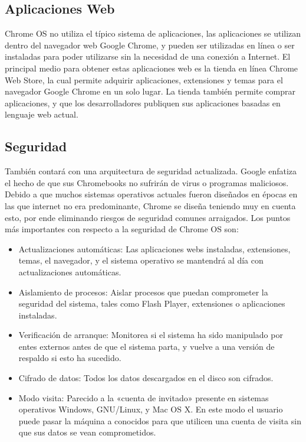\documentclass[paper=a4, fontsize=12pt]{article} 		%
\numberwithin{equation}{section}						%
\numberwithin{table}{section} 							%
\begin{document}
\subsection{Aplicaciones Web }
Chrome OS no utiliza el típico sistema de aplicaciones, las aplicaciones se utilizan dentro del navegador web Google Chrome, y pueden ser utilizadas en línea o ser instaladas para poder utilizarse sin la necesidad de una conexión a Internet. El principal medio para obtener estas aplicaciones web es la tienda en línea Chrome Web Store, la cual permite adquirir aplicaciones, extensiones y temas para el navegador Google Chrome en un solo lugar. La tienda también permite comprar aplicaciones, y que los desarrolladores publiquen sus aplicaciones basadas en lenguaje web actual.
\subsection{Seguridad }
También contará con una arquitectura de seguridad actualizada. Google enfatiza el hecho de que sus Chromebooks no sufrirán de virus o programas maliciosos. Debido a que muchos sistemas operativos actuales fueron diseñados en épocas en las que internet no era predominante, Chrome se diseña teniendo muy en cuenta esto, por ende eliminando riesgos de seguridad comunes arraigados.
Los puntos más importantes con respecto a la seguridad de Chrome OS son:
\begin{itemize}
\item Actualizaciones automáticas: Las aplicaciones webs instaladas, extensiones, temas, el navegador, y el sistema operativo se mantendrá al día con actualizaciones automáticas.
\item     Aislamiento de procesos: Aislar procesos que puedan comprometer la seguridad del sistema, tales como Flash Player, extensiones o aplicaciones instaladas.
\item     Verificación de arranque: Monitorea si el sistema ha sido manipulado por entes externos antes de que el sistema parta, y vuelve a una versión de respaldo si esto ha sucedido.
\item     Cifrado de datos: Todos los datos descargados en el disco son cifrados.
\item     Modo visita: Parecido a la «cuenta de invitado» presente en sistemas operativos Windows, GNU/Linux, y Mac OS X. En este modo el usuario puede pasar la máquina a conocidos para que utilicen una cuenta de visita sin que sus datos se vean comprometidos.
\end{itemize}
\end{document}
